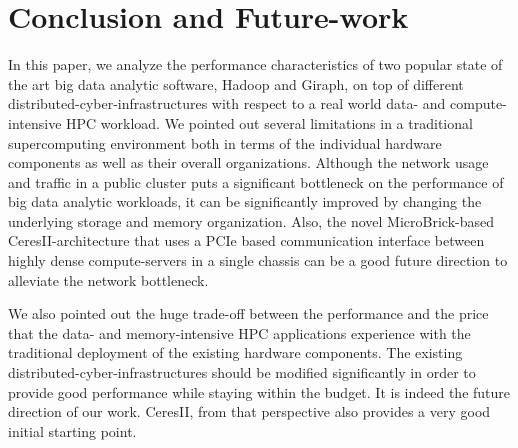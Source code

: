 \documentclass[conference]{IEEEtran}
\begin{document}
\section {Conclusion and Future-work} \label{conclusion}
In this paper, we analyze the performance characteristics of two popular state of the art big data analytic software, Hadoop and Giraph, on top of different distributed-cyber-infrastructures with respect to a real world data- and compute-intensive HPC workload. We pointed out several limitations in a traditional supercomputing environment both in terms of the individual hardware components as well as their overall organizations. Although the network usage and traffic in a public cluster puts a significant bottleneck on the performance of big data analytic workloads, it can be significantly improved by changing the underlying storage and memory organization. Also, the novel MicroBrick-based CeresII-architecture that uses a PCIe based communication interface between highly dense compute-servers in a single chassis can be a good future direction to alleviate the network bottleneck.

We also pointed out the huge trade-off between the performance and the price that the data- and memory-intensive HPC applications experience with the traditional deployment of the existing hardware components. The existing distributed-cyber-infrastructures should be modified significantly in order to provide good performance while staying within the budget. It is indeed the future direction of our work. CeresII, from that perspective also provides a very good initial starting point.









\end{document}
